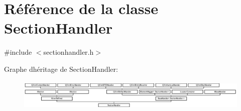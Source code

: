 \hypertarget{class_section_handler}{}\section{Référence de la classe Section\+Handler}
\label{class_section_handler}


{\ttfamily \#include $<$sectionhandler.\+h$>$}

Graphe d\textquotesingle{}héritage de Section\+Handler\+:\begin{figure}[H]
\begin{center}
\leavevmode
\includegraphics[height=1.461187cm]{class_section_handler}
\end{center}
\end{figure}
